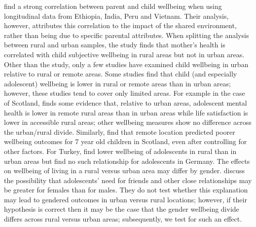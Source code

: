\documentclass[11pt, letterpaper]{article}
\begin{document}
\begin{spacing}{1.9}
\citet{borga2022} find a strong correlation
between parent and child wellbeing when using longitudinal data from Ethiopia,
India, Peru and Vietnam. Their analysis, however,  attributes this correlation to the impact of the shared environment, rather than being due to specific parental attributes. When splitting the analysis between rural and urban samples, the study finds that mother's health is correlated with child subjective wellbeing in rural areas but not in urban areas.
Other than the \citet{borga2022} study, only a few studies have examined child
wellbeing in urban relative to rural or remote areas. Some studies find that
child (and especially adolescent) wellbeing is lower in rural or remote areas
than in urban areas; however, these studies tend to cover only limited areas. For example in the case of Scotland, \citet{levin2014} finds some evidence that, relative to urban areas, adolescent mental health is lower in remote rural areas than in urban areas while life satisfaction is lower in accessible rural areas; other wellbeing measures show no difference across the urban/rural divide. Similarly, \citet{parkes2016} find that remote location predicted poorer wellbeing outcomes for 7 year old children in Scotland, even after controlling for other factors. For Turkey, \citet{yeresyan2014} find lower wellbeing of adolescents in rural than in urban areas but find no such relationship for adolescents in Germany. 
The effects on wellbeing of living in a rural versus urban area may differ by
gender. \citet{powdthavee2008} discuss the possibility that adolescents' need
for friends and other close relationships may be greater for females than for
males. They do not test whether this explanation may lead to gendered outcomes
in urban versus rural locations; however, if their hypothesis is correct then it
may be the case that the gender wellbeing divide differs across rural versus
urban areas; subsequently, we test for such an effect.


\end{spacing}
\end{document}
